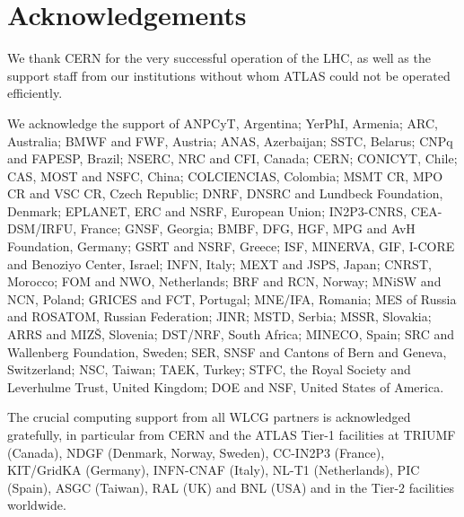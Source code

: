 \documentclass[11pt,a4paper,dvips]{article}
\begin{document}

\section{Acknowledgements}

We thank CERN for the very successful operation of the LHC, as well as the
support staff from our institutions without whom ATLAS could not be
operated efficiently.

We acknowledge the support of ANPCyT, Argentina; YerPhI, Armenia; ARC,
Australia; BMWF and FWF, Austria; ANAS, Azerbaijan; SSTC, Belarus; CNPq and FAPESP,
Brazil; NSERC, NRC and CFI, Canada; CERN; CONICYT, Chile; CAS, MOST and NSFC,
China; COLCIENCIAS, Colombia; MSMT CR, MPO CR and VSC CR, Czech Republic;
DNRF, DNSRC and Lundbeck Foundation, Denmark; EPLANET, ERC and NSRF, European Union;
IN2P3-CNRS, CEA-DSM/IRFU, France; GNSF, Georgia; BMBF, DFG, HGF, MPG and AvH
Foundation, Germany; GSRT and NSRF, Greece; ISF, MINERVA, GIF, I-CORE and Benoziyo Center,
Israel; INFN, Italy; MEXT and JSPS, Japan; CNRST, Morocco; FOM and NWO,
Netherlands; BRF and RCN, Norway; MNiSW and NCN, Poland; GRICES and FCT, Portugal; MNE/IFA, Romania; MES of Russia and ROSATOM, Russian Federation; JINR; MSTD,
Serbia; MSSR, Slovakia; ARRS and MIZ\v{S}, Slovenia; DST/NRF, South Africa;
MINECO, Spain; SRC and Wallenberg Foundation, Sweden; SER, SNSF and Cantons of
Bern and Geneva, Switzerland; NSC, Taiwan; TAEK, Turkey; STFC, the Royal
Society and Leverhulme Trust, United Kingdom; DOE and NSF, United States of
America.

The crucial computing support from all WLCG partners is acknowledged
gratefully, in particular from CERN and the ATLAS Tier-1 facilities at
TRIUMF (Canada), NDGF (Denmark, Norway, Sweden), CC-IN2P3 (France),
KIT/GridKA (Germany), INFN-CNAF (Italy), NL-T1 (Netherlands), PIC (Spain),
ASGC (Taiwan), RAL (UK) and BNL (USA) and in the Tier-2 facilities
worldwide.
\end{document}

